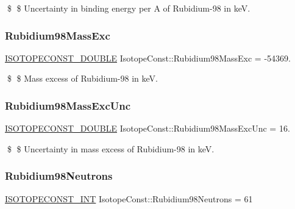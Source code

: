 \$ \$ Uncertainty in binding energy per A of Rubidium-\/98 in keV. \mbox{\label{group___isotope_const-_rubidium-_rb98_ga3ae3538e2866af5515e21855f0f4daed}} 
\subsubsection{\texorpdfstring{Rubidium98\+Mass\+Exc}{Rubidium98MassExc}}
{\footnotesize\ttfamily \mbox{\hyperlink{group___isotope_const-_macros_ga8f45a7272ce02c0b4c65c44636ed719a}{I\+S\+O\+T\+O\+P\+E\+C\+O\+N\+S\+T\+\_\+\+D\+O\+U\+B\+LE}} Isotope\+Const\+::\+Rubidium98\+Mass\+Exc = -\/54369.}

\$ \$ Mass excess of Rubidium-\/98 in keV. \mbox{\label{group___isotope_const-_rubidium-_rb98_ga243c9ea1ffb2d3c5d03ef82fe7d16010}} 
\subsubsection{\texorpdfstring{Rubidium98\+Mass\+Exc\+Unc}{Rubidium98MassExcUnc}}
{\footnotesize\ttfamily \mbox{\hyperlink{group___isotope_const-_macros_ga8f45a7272ce02c0b4c65c44636ed719a}{I\+S\+O\+T\+O\+P\+E\+C\+O\+N\+S\+T\+\_\+\+D\+O\+U\+B\+LE}} Isotope\+Const\+::\+Rubidium98\+Mass\+Exc\+Unc = 16.}

\$ \$ Uncertainty in mass excess of Rubidium-\/98 in keV. \mbox{\label{group___isotope_const-_rubidium-_rb98_ga18896eee0d5125f95b9f6e35dbf852d0}} 
\subsubsection{\texorpdfstring{Rubidium98\+Neutrons}{Rubidium98Neutrons}}
{\footnotesize\ttfamily \mbox{\hyperlink{group___isotope_const-_macros_ga5f18360b3e99483a35c32d789e62621c}{I\+S\+O\+T\+O\+P\+E\+C\+O\+N\+S\+T\+\_\+\+I\+NT}} Isotope\+Const\+::\+Rubidium98\+Neutrons = 61}

